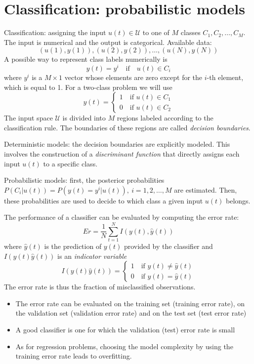 \documentclass{book}
\theoremstyle{definition}
\theoremstyle{remark}
\theoremstyle{remark}
\begin{document}
\chapter{Classification: probabilistic models}
Classification: assigning the input $u(t)\in \mathcal{U}$ to one of $M$ classes $C_1,C_2,\dots,C_M$. The input is numerical and the output is categorical. 
Available data: 
\[
    (u(1),y(1)),(u(2),y(2)),\dots,(u(N),y(N))
\]
A possible way to represent class labels numerically is 
\[
    y(t) = y^i \quad \text{if} \quad u(t)\in C_i
\]
where $y^i$ is a $M\times 1$ vector whose elements are zero except for the $i$-th element, which is equal to 1. For a two-class problem we will use 
\[
    y(t) = \begin{cases}
        1 \quad \text{if } u(t) \in C_1\\
        0 \quad \text{if } u(t) \in C_2
    \end{cases}
\]
The input space $\mathcal{U}$ is divided into $M$ regions labeled according to the classification rule. The boundaries of these regions are called \emph{decision boundaries}.

Deterministic models: the decision boundaries are explicitly modeled. This involves the construction of a \emph{discriminant function} that directly assigns each input $u(t)$ to a specific class. 

Probabilistic models: first, the posterior probabilities $P(C_i|u(t)) = P(y(t)=y^i|u(t)),\ i= 1,2,\dots,M$ are estimated. Then, these probabilities are used to decide to which class a given input $u(t)$ belongs. 

The performance of a classifier can be evaluated by computing the error rate: 
\[
    Er = \displaystyle\frac{1}{N}\displaystyle\sum_{t=1}^{N}I(y(t),\hat{y}(t))
\]
where $\hat{y}(t)$ is the prediction of $y(t)$ provided by the classifier and $I(y(t)\hat{y}(t))$ is an \emph{indicator variable} 
\[
    I(y(t)\hat{y}(t)) = \begin{cases}
        1 \quad \text{if } y(t)\neq \hat{y}(t)\\
        0 \quad \text{if } y(t) = \hat{y}(t)
    \end{cases}
\]
The error rate is thus the fraction of misclassified observations. 
\begin{itemize}
    \item The error rate can be evaluated on the training set (training error rate), on the validation set (validation error rate) and on the test set (test error rate)
    \item A good classifier is one for which the validation (test) error rate is small 
    \item As for regression problems, choosing the model complexity by using the training error rate leads to overfitting. 
\end{itemize}
\end{document}
